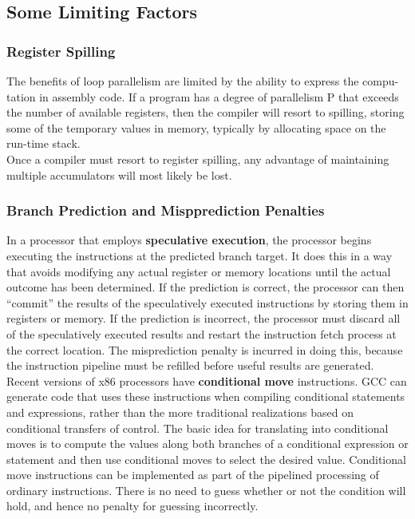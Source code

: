 \documentclass[11pt]{article}
\begin{document}
\subsection{Some Limiting Factors}
\label{sec:orgc8123d6}

\subsubsection{Register Spilling}
\label{sec:orga7a6b0e}
The benefits of loop parallelism are limited by the ability to express the compu- tation in assembly code. If a program has a degree of parallelism P that exceeds the number of available registers, then the compiler will resort to spilling, storing some of the temporary values in memory, typically by allocating space on the run-time stack.\\

Once a compiler must resort to register spilling, any advantage of maintaining multiple accumulators will most likely be lost.\\

\subsubsection{Branch Prediction and Mispprediction Penalties}
\label{sec:org0790f27}
In a processor that employs \textbf{speculative execution}, the processor begins executing the instructions at the predicted branch target. It does this in a way that avoids modifying any actual register or memory locations until the actual outcome has been determined. If the prediction is correct, the processor can then “commit” the results of the speculatively executed instructions by storing them in registers or memory. If the prediction is incorrect, the processor must discard all of the speculatively executed results and restart the instruction fetch process at the correct location. The misprediction penalty is incurred in doing this, because the instruction pipeline must be refilled before useful results are generated.\\


Recent versions of x86 processors have \textbf{conditional move} instructions. GCC can generate code that uses these instructions when compiling conditional statements and expressions, rather than the more traditional realizations based on conditional transfers of control. The basic idea for translating into conditional moves is to compute the values along both branches of a conditional expression or statement and then use conditional moves to select the desired value. Conditional move instructions can be implemented as part of the pipelined processing of ordinary instructions. There is no need to guess whether or not the condition will hold, and hence no penalty for guessing incorrectly.\\
\end{document}
